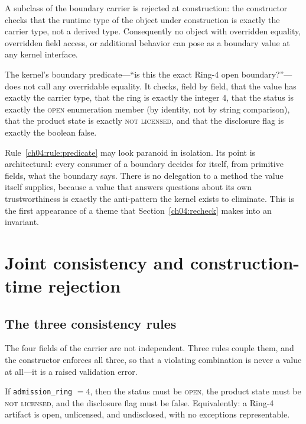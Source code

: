 \begin{ruleenv}\label{ch04:rule:exacttype}
A subclass of the boundary carrier is rejected at construction: the
constructor checks that the runtime type of the object under construction is
exactly the carrier type, not a derived type. Consequently no object with
overridden equality, overridden field access, or additional behavior can pose
as a boundary value at any kernel interface.
\end{ruleenv}

\begin{ruleenv}\label{ch04:rule:predicate}
The kernel's boundary predicate---``is this the exact Ring-4 open
boundary?''---does not call any overridable equality. It checks, field by
field, that the value has exactly the carrier type, that the ring is exactly
the integer 4, that the status is exactly the \textsc{open} enumeration
member (by identity, not by string comparison), that the product state is
exactly \textsc{not licensed}, and that the disclosure flag is exactly the
boolean false.
\end{ruleenv}

Rule~\ref{ch04:rule:predicate} may look paranoid in isolation. Its point is
architectural: every consumer of a boundary decides for itself, from
primitive fields, what the boundary says. There is no delegation to a method
the value itself supplies, because a value that answers questions about its
own trustworthiness is exactly the anti-pattern the kernel exists to
eliminate. This is the first appearance of a theme that
Section~\ref{ch04:recheck} makes into an invariant.

\section{Joint consistency and construction-time rejection}\label{ch04:consistency}

\subsection{The three consistency rules}

The four fields of the carrier are not independent. Three rules couple them,
and the constructor enforces all three, so that a violating combination is
never a value at all---it is a raised validation error.

\begin{ruleenv}\label{ch04:rule:c1}
If \texttt{admission\_ring} $=4$, then the status must be \textsc{open}, the
product state must be \textsc{not licensed}, and the disclosure flag must be
false. Equivalently: a Ring-4 artifact is open, unlicensed, and undisclosed,
with no exceptions representable.
\end{ruleenv}

